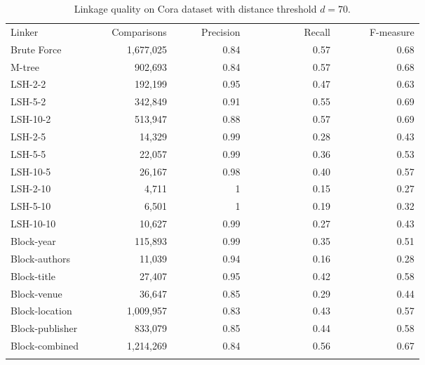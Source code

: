 \documentclass{llncs}
\begin{document}

\begin{table}[t]
\caption{Linkage quality on Cora dataset with distance threshold $d= 70$.}
\label{comparison-of-results-cora}
\centering
\begin{footnotesize}
\begin{tabular}{lrrrr} \hline\noalign{\smallskip}
Linker~~~~~~~~~~ & ~~~Comparisons & ~~~~~Precision & ~~~~~~~~~~~Recall & ~~~~~~F-measure \\
\noalign{\smallskip} \hline \noalign{\smallskip}
Brute Force     & 1,677,025 & 0.84 & 0.57 & 0.68 \\
\noalign{\smallskip} \hline \noalign{\smallskip}
M-tree          &   902,693 & 0.84 & 0.57 & 0.68 \\
\noalign{\smallskip} \hline \noalign{\smallskip}
LSH-2-2         &   192,199 & 0.95 & 0.47 & 0.63 \\
LSH-5-2         &   342,849 & 0.91 & 0.55 & 0.69 \\
LSH-10-2        &   513,947 & 0.88 & 0.57 & 0.69 \\
LSH-2-5         &    14,329 & 0.99 & 0.28 & 0.43 \\
LSH-5-5         &    22,057 & 0.99 & 0.36 & 0.53 \\
LSH-10-5        &    26,167 & 0.98 & 0.40 & 0.57 \\
LSH-2-10        &     4,711 &    1 & 0.15 & 0.27 \\
LSH-5-10        &     6,501 &    1 & 0.19 & 0.32 \\
LSH-10-10       &    10,627 & 0.99 & 0.27 & 0.43 \\
\noalign{\smallskip} \hline \noalign{\smallskip}
Block-year      &   115,893 & 0.99 & 0.35 & 0.51 \\
Block-authors   &    11,039 & 0.94 & 0.16 & 0.28 \\
Block-title     &    27,407 & 0.95 & 0.42 & 0.58 \\
Block-venue     &    36,647 & 0.85 & 0.29 & 0.44 \\
Block-location  & 1,009,957 & 0.83 & 0.43 & 0.57 \\
Block-publisher &   833,079 & 0.85 & 0.44 & 0.58 \\
Block-combined  & 1,214,269 & 0.84 & 0.56 & 0.67 \\
\noalign{\smallskip} \hline
\end{tabular}
\end{footnotesize}
\end{table}
\end{document}
